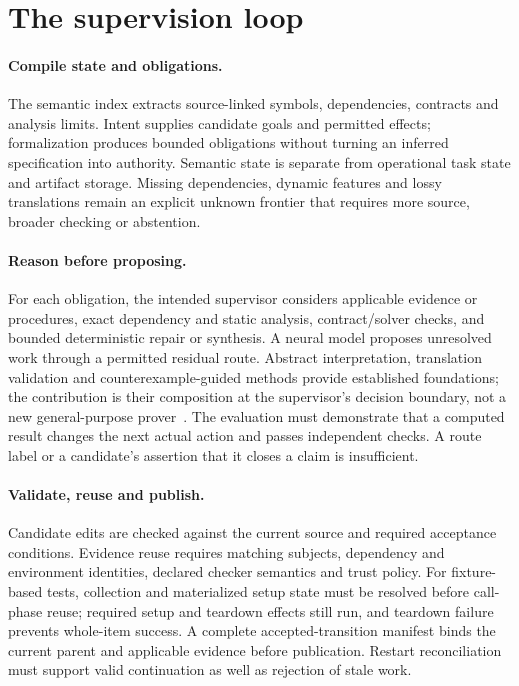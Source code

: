 \section{The supervision loop}
\label{sec:system}

\paragraph{Compile state and obligations.}
The semantic index extracts source-linked symbols, dependencies, contracts and
analysis limits. Intent supplies candidate goals and permitted effects;
formalization produces bounded obligations without turning an inferred
specification into authority. Semantic state is separate from operational task
state and artifact storage. Missing dependencies, dynamic features and lossy
translations remain an explicit unknown frontier that requires more source,
broader checking or abstention.

\paragraph{Reason before proposing.}
For each obligation, the intended supervisor considers applicable evidence or
procedures, exact dependency and static analysis, contract/solver checks, and
bounded deterministic repair or synthesis. A neural model proposes unresolved
work through a permitted residual route. Abstract interpretation, translation
validation and counterexample-guided methods provide established foundations;
the contribution is their composition at the supervisor's decision boundary,
not a new general-purpose prover~\citep{baseline02,baseline03,baseline04,baseline05}.
The evaluation must demonstrate that a computed result changes the next actual
action and passes independent checks. A route label or a candidate's assertion
that it closes a claim is insufficient.

\paragraph{Validate, reuse and publish.}
Candidate edits are checked against the current source and required acceptance
conditions. Evidence reuse requires matching subjects, dependency and
environment identities, declared checker semantics and trust policy. For
fixture-based tests, collection and materialized setup state must be resolved
before call-phase reuse; required setup and teardown effects still run, and
teardown failure prevents whole-item success. A complete accepted-transition
manifest binds the current parent and applicable evidence before publication.
Restart reconciliation must support valid continuation as well as rejection of
stale work.

